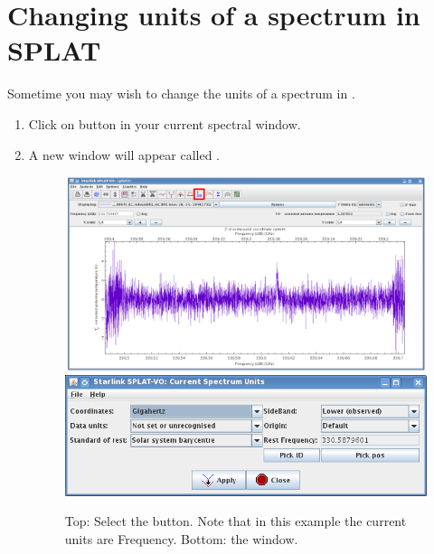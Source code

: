 \documentclass[11pt,oneside,chapters]{starlink}
\begin{document}
\section{Changing units of a spectrum in SPLAT}
\label{sec:splat-units}

Sometime you may wish to change the units of a spectrum in \splat.


\begin{enumerate}[label=(\textbf{\arabic*})]

\item Click on 
button in your current spectral window.


\item A new window will appear called .

\begin{figure}[h!]
\begin{center}
\includegraphics[width=0.9\linewidth]{sc20_splat_spectrum_units}
\includegraphics[width=0.7\linewidth]{sc20_splat_spectrum_units2}
\caption[Change the units of the current spectrum.]{\label{fig:splat_units1}
  Top: Select the 
  button. Note that in this example the current units are Frequency.
  Bottom: the  window.}
\end{center}
\end{figure}



\end{enumerate}
\end{document}
